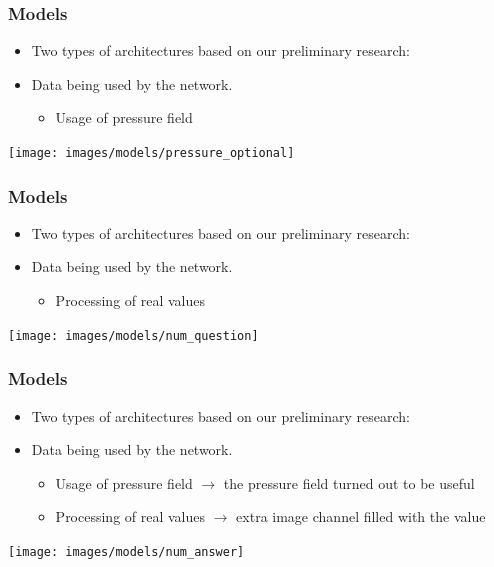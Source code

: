\documentclass[18pt]{beamer}
\begin{document}
\begin{frame}[t]
  \frametitle{Models}
  \begin{itemize}
  \item Two types of architectures based on our preliminary research:
  \item Data being used by the network.
    \begin{itemize}
    \item Usage of pressure field
    \end{itemize}
  \end{itemize}

  \vspace{0.5cm}
  \begin{center}
    \texttt{[image: images/models/pressure\_optional]}
  \end{center}
  
\end{frame}

\begin{frame}[t]
  \frametitle{Models}
  \begin{itemize}
  \item Two types of architectures based on our preliminary research:
  \item Data being used by the network.
    \begin{itemize}
    \item Processing of real values
    \end{itemize}
  \end{itemize}

  \vspace{0.5cm}
    \begin{center}
    \texttt{[image: images/models/num\_question]}
  \end{center}
\end{frame}


\begin{frame}[t]
  \frametitle{Models}
  \begin{itemize}
  \item Two types of architectures based on our preliminary research:
  \item Data being used by the network.
    \begin{itemize}
    \item Usage of pressure field $\rightarrow$ the pressure field turned out to be useful
    \item Processing of real values $\rightarrow$ extra image channel filled with the value
    \end{itemize}
  \end{itemize}

  \vspace{0.3cm}
    \begin{center}
    \texttt{[image: images/models/num\_answer]}
  \end{center}
  
\end{frame}
\end{document}
